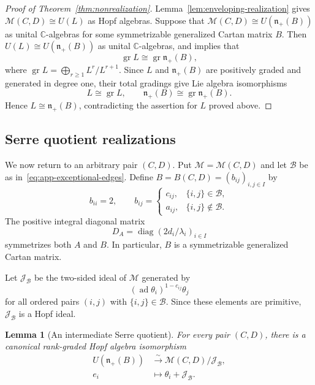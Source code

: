 \documentclass[12pt,reqno]{amsart}
\numberwithin{equation}{section}
\newtheorem{lemma}[theorem]{Lemma}
\theoremstyle{definition}
\theoremstyle{remark}
\newcommand{\C}{\mathbb C}
\newcommand{\nplus}{\mathfrak n_+}
\newcommand{\ad}{\operatorname{ad}}
\newcommand{\diag}{\operatorname{diag}}
\theoremstyle{plain}
\theoremstyle{plain}
\begin{document}
\begin{proof}[Proof of Theorem~\ref{thm:nonrealization}]
Lemma~\ref{lem:enveloping-realization} gives $\mathcal M(C,D)\cong U(L)$ as Hopf algebras. Suppose that $\mathcal M(C,D)\cong U(\mathfrak n_+(B))$ as unital $\C$-algebras for some symmetrizable generalized Cartan matrix $B$. Then $U(L)\cong U(\mathfrak n_+(B))$ as unital $\C$-algebras, and \cite[Proposition~4.1]{RU07} implies that
\[
    \operatorname{gr}L
    \cong\operatorname{gr}\mathfrak n_+(B),
\]
where $\operatorname{gr}L=\bigoplus_{r\ge1}L^r/L^{r+1}$. Since $L$ and $\nplus(B)$ are positively graded and generated in degree one, their total gradings give Lie algebra isomorphisms
\[
    L\cong\operatorname{gr}L,\qquad
    \mathfrak n_+(B)\cong\operatorname{gr}\mathfrak n_+(B).
\]
Hence $L\cong\mathfrak n_+(B)$, contradicting the assertion for $L$ proved above.
\end{proof}


\subsection{Serre quotient realizations}
We now return to an arbitrary pair $(C,D)$. Put $\mathcal M=\mathcal M(C,D)$ and let $\mathscr B$ be as in~\eqref{eq:app-exceptional-edges}.
Define $B=B(C,D)=(b_{ij})_{i,j\in I}$ by
\begin{equation}\label{eq:app-matrix-B}
 b_{ii}=2,\qquad
 b_{ij}=
 \begin{cases}
 c_{ij},&\{i,j\}\in\mathscr B,\\
 a_{ij},&\{i,j\}\notin\mathscr B.
 \end{cases}
\end{equation}
The positive integral diagonal matrix
\[
 D_A=\diag(2d_i/\lambda_i)_{i\in I}
\]
symmetrizes both $A$ and $B$. In particular, $B$ is a symmetrizable generalized Cartan matrix.

Let $\mathcal J_{\mathscr B}$ be the two-sided ideal of $\mathcal M$ generated by
\begin{equation}\label{eq:app-exceptional-ideal}
 (\ad\theta_i)^{1-c_{ij}}\theta_j
\end{equation}
for all ordered pairs $(i,j)$ with $\{i,j\}\in\mathscr B$. Since these elements are primitive, $\mathcal J_{\mathscr B}$ is a Hopf ideal.

\begin{lemma}[An intermediate Serre quotient] \label{lem:app-intermediate-quotient}
For every pair $(C,D)$, there is a canonical rank-graded Hopf algebra isomorphism
\begin{equation}\label{eq:app-intermediate-isomorphism}
\begin{aligned}
 U(\nplus(B))&\xrightarrow{\sim}
\mathcal M(C,D)/\mathcal J_{\mathscr B},\\
 e_i&\longmapsto\theta_i+\mathcal J_{\mathscr B}.
\end{aligned}
\end{equation}
\end{lemma}
\end{document}
